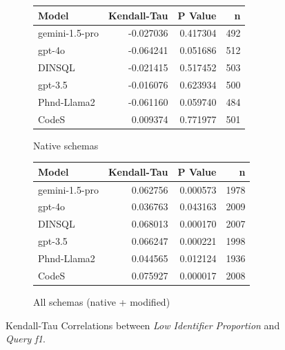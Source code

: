\begin{figure}
  \centering
  \begin{subfigure}{.5\linewidth}
      \centering
      \begin{tabular}{lrrr}
\toprule
Model & Kendall-Tau & P Value & n \\
\midrule
gemini-1.5-pro & -0.027036 & 0.417304 & 492 \\
gpt-4o & -0.064241 & 0.051686 & 512 \\
DINSQL & -0.021415 & 0.517452 & 503 \\
gpt-3.5 & -0.016076 & 0.623934 & 500 \\
Phnd-Llama2 & -0.061160 & 0.059740 & 484 \\
CodeS & 0.009374 & 0.771977 & 501 \\
\bottomrule
\end{tabular}

      \caption{Native schemas}
      \label{table:natmedium-f1-ktau-native}
  \end{subfigure}%
  \begin{subfigure}{.5\linewidth}
      \centering
      \begin{tabular}{lrrr}
\toprule
Model & Kendall-Tau & P Value & n \\
\midrule
gemini-1.5-pro & 0.062756 & 0.000573 & 1978 \\
gpt-4o & 0.036763 & 0.043163 & 2009 \\
DINSQL & 0.068013 & 0.000170 & 2007 \\
gpt-3.5 & 0.066247 & 0.000221 & 1998 \\
Phnd-Llama2 & 0.044565 & 0.012124 & 1936 \\
CodeS & 0.075927 & 0.000017 & 2008 \\
\bottomrule
\end{tabular}

      \caption{All schemas (native + modified)}
      \label{table:natmedium-f1-ktau-all}
  \end{subfigure}
  \caption{Kendall-Tau Correlations between \emph{Low Identifier Proportion} and \emph{Query f1}.}
\end{figure}

